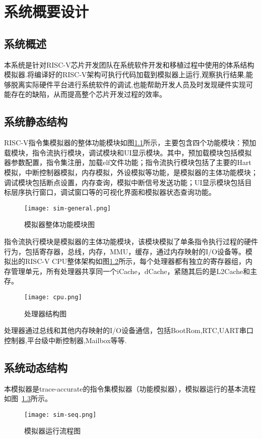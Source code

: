 
\chapter{系统概要设计}

\section{系统概述}
本系统是针对RISC-V芯片开发团队在系统软件开发和移植过程中使用的体系结构模拟器.将编译好的RISC-V架构可执行代码加载到模拟器上运行,观察执行结果,能够脱离实际硬件平台进行系统软件的调试,也能帮助开发人员及时发现硬件实现可能存在的缺陷，从而提高整个芯片开发过程的效率。

\section{系统静态结构}
RISC-V指令集模拟器的整体功能模块如图\ref{fig:sim_general}所示，主要包含四个功能模块：预加载模块，指令流执行模块，调试模块和UI显示模块。其中，预加载模块包括模拟器参数配置，指令集注册，加载elf文件功能；指令流执行模块包括了主要的Hart模拟，中断控制器模拟，内存模拟，外设模拟等功能，是模拟器的主体功能模块；调试模块包括断点设置，内存查询，模拟中断信号发送功能；UI显示模块包括目标层序执行窗口，调试窗口等的可视化界面和模拟器状态查询功能。
\begin{figure}[h]
  \centering
  \texttt{[image: sim-general.png]}
  \caption{模拟器整体功能模块图}
  \label{fig:sim_general}
\end{figure}


指令流执行模块是模拟器的主体功能模块，该模块模拟了单条指令执行过程的硬件行为，包括寄存器，总线，内存，MMU，缓存，通过内存映射的I/O设备等。模拟出的RISC-V CPU整体架构如图\ref{fig:cpu}所示，每个处理器都有独立的寄存器组，内存管理单元，所有处理器共享同一个iCache，dCache，紧随其后的是L2Cache和主存。
\begin{figure}[h]
  \centering
  \texttt{[image: cpu.png]}
  \caption{处理器结构图}
  \label{fig:cpu}
\end{figure}


处理器通过总线和其他内存映射的I/O设备通信，包括BootRom,RTC,UART串口控制器,平台级中断控制器,Mailbox等等.

\section{系统动态结构}
本模拟器是trace-accurate的指令集模拟器（功能模拟器），模拟器运行的基本流程如图~\ref{fig:sim-seq}所示。
\begin{figure}[h]
  \centering
  \texttt{[image: sim-seq.png]}
  \caption{模拟器运行流程图}
  \label{fig:sim-seq}
\end{figure}



